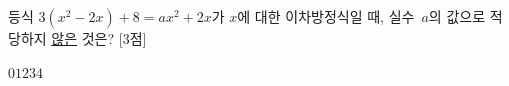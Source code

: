 등식 $3(x^2-2x)+8=ax^2+2x$가 $x$에 대한 이차방정식일 때, 실수~$a$의 값으로 적당하지 \underline{않은} 것은? \mbox{[3점]}
\begin{choices32}{$0$}{$1$}{$2$}{$3$}{$4$}\end{choices32}
